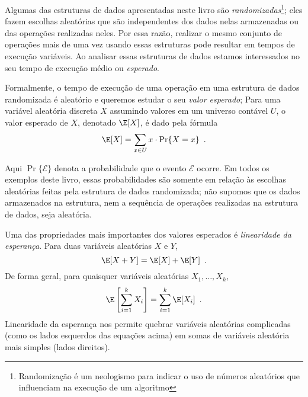 %
%
%
%
%
Algumas das estruturas de dados apresentadas neste livro são \emph{randomizadas}\footnote{Randomização é um neologismo para indicar o uso de números aleatórios que influenciam na execução de um algoritmo};
eles fazem escolhas aleatórias que são independentes dos dados nelas armazenadas
ou das operações realizadas neles. Por essa razão,
realizar o mesmo conjunto de operações mais de uma vez usando essas
estruturas pode resultar em tempos de execução variáveis. Ao analisar essas
estruturas de dados estamos interessados no seu tempo de execução médio ou \emph{esperado}.
%
%

Formalmente, o tempo de execução de uma operação em uma estrutura de dados randomizada é aleatório e queremos estudar o seu \emph{valor esperado};
%
Para uma variável aleatória discreta
 $X$ assumindo valores em um universo contável 
$U$, o valor esperado de $X$, denotado $\E[X]$, é dado pela fórmula 
\[
    \E[X] = \sum_{x\in U} x\cdot\Pr\{X=x\} \enspace .
\]

Aqui $\Pr\{\mathcal{E}\}$ denota a probabilidade que o evento 
$\mathcal{E}$ ocorre.  Em todos os exemplos deste livro, essas probabilidades
são somente em relação às escolhas aleatórias feitas pela estrutura de dados randomizada; não supomos que os dados armazenados na estrutura, nem a sequência de operações realizadas na estrutura de dados, seja aleatória.

Uma das propriedades mais importantes dos valores esperados é 
\emph{linearidade da esperança}.
%
Para duas variáveis aleatórias $X$ e $Y$,
\[
   \E[X+Y] = \E[X] + \E[Y] \enspace .
\]
De forma geral, para quaisquer variáveis aleatórias $X_1,\ldots,X_k$,
\[
   \E\left[\sum_{i=1}^k X_i\right] = \sum_{i=1}^k \E[X_i] \enspace .
\]
Linearidade da esperança nos permite quebrar variáveis aleatórias complicadas (como os lados esquerdos das equações acima) em somas de variáveis aleatória mais simples (lados direitos).

